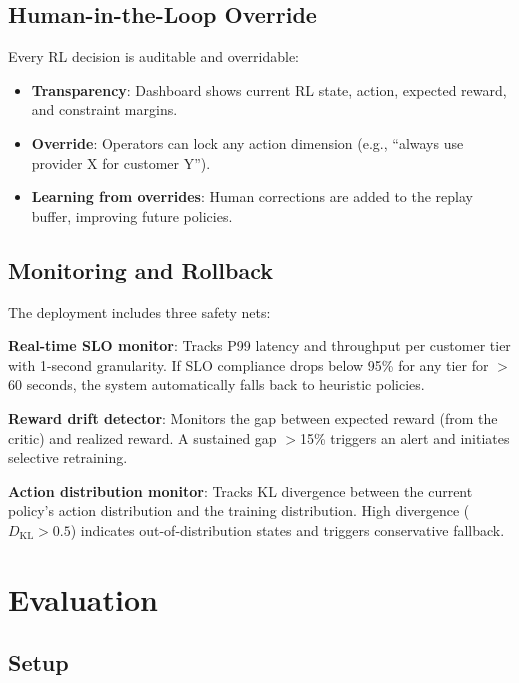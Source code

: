 \documentclass[conference,10pt]{IEEEtran}
\begin{document}
\subsection{Human-in-the-Loop Override}

Every RL decision is auditable and overridable:
\begin{itemize}
\item \textbf{Transparency}: Dashboard shows current RL state, action, expected reward, and constraint margins.
\item \textbf{Override}: Operators can lock any action dimension (e.g., ``always use provider X for customer Y'').
\item \textbf{Learning from overrides}: Human corrections are added to the replay buffer, improving future policies.
\end{itemize}

\subsection{Monitoring and Rollback}

The deployment includes three safety nets:

\textbf{Real-time SLO monitor}: Tracks P99 latency and throughput per customer tier with 1-second granularity. If SLO compliance drops below 95\% for any tier for $>$60 seconds, the system automatically falls back to heuristic policies.

\textbf{Reward drift detector}: Monitors the gap between expected reward (from the critic) and realized reward. A sustained gap $>$15\% triggers an alert and initiates selective retraining.

\textbf{Action distribution monitor}: Tracks KL divergence between the current policy's action distribution and the training distribution. High divergence ($D_\text{KL} > 0.5$) indicates out-of-distribution states and triggers conservative fallback.

\section{Evaluation}
\label{sec:eval}

\subsection{Setup}
\end{document}
